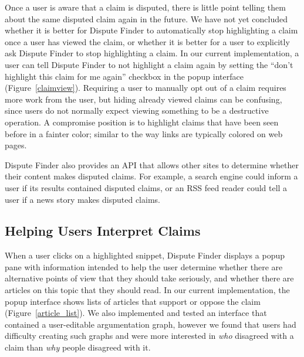 \documentclass{www2010-submission}
\newcommand{\todo}[1]{}
\begin{document}
Once a user is aware that a claim is disputed, there is little point telling them about the same disputed claim again in the future. We have not yet concluded whether it is better for Dispute Finder to automatically stop highlighting a claim once a user has viewed the claim, or whether it is better for a user to explicitly ask Dispute Finder to stop highlighting a claim. In our current implementation, a user can tell Dispute Finder to not highlight a claim again by setting the ``don't highlight this claim for me again'' checkbox in the popup interface (Figure~\ref{claimview}). Requiring a user to manually opt out of a claim requires more work from the user, but hiding already viewed claims can be confusing, since users do not normally expect viewing something to be a destructive operation. A compromise position is to highlight claims that have been seen before in a fainter color; similar to the way links are typically colored on web pages.

\todo{Try using a fainter color}

\todo{Text is wrong in the screenshot}

Dispute Finder also provides an API that allows other sites to determine whether their content makes disputed claims. For example, a search engine could inform a user if its results contained disputed claims, or an RSS feed reader could tell a user if a news story makes disputed claims.

\todo{Document API online}
\todo{Change the highlight color to yellow? Auto-adjust highlight color based on background color?}
\todo{Should we automatically adjust the highlight color, based on the background color of the page}
\todo{Discuss previous work on highlighting here, rather than in related work?}



\subsection{Helping Users Interpret Claims}

When a user clicks on a highlighted snippet, Dispute Finder displays a popup pane with information intended to help the user determine whether there are alternative points of view that they should take seriously, and whether there are articles on this topic that they should read. In our current implementation, the popup interface shows lists of articles that support or oppose the claim (Figure~\ref{article_list}). We also implemented and tested an interface that contained a user-editable argumentation graph, however we found that users had difficulty creating such graphs and were more interested in {\it who} disagreed with a claim than {\it why} people disagreed with it.
\end{document}
